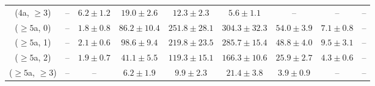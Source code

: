 \begin{table}[h!]
{\begin{tabular}{ccccccccc}
	(4a, $\ge3$) & -- & $6.2\pm 1.2$ & $19.0\pm 2.6$ & $12.3\pm 2.3$ & $5.6\pm 1.1$ & -- & -- & -- \\[0.5ex] 
	($\ge5$a, 0) & -- & $1.8\pm 0.8$ & $86.2\pm 10.4$ & $251.8\pm 28.1$ & $304.3\pm 32.3$ & $54.0\pm 3.9$ & $7.1\pm 0.8$ & -- \\[0.5ex] 
	($\ge5$a, 1) & -- & $2.1\pm 0.6$ & $98.6\pm 9.4$ & $219.8\pm 23.5$ & $285.7\pm 15.4$ & $48.8\pm 4.0$ & $9.5\pm 3.1$ & -- \\[0.5ex] 
	($\ge5$a, 2) & -- & $1.9\pm 0.7$ & $41.1\pm 5.5$ & $119.3\pm 15.1$ & $166.3\pm 10.6$ & $25.9\pm 2.7$ & $4.3\pm 0.6$ & -- \\[0.5ex] 
	($\ge5$a, $\ge3$) & -- & -- & $6.2\pm 1.9$ & $9.9\pm 2.3$ & $21.4\pm 3.8$ & $3.9\pm 0.9$ & -- & -- \\[0.5ex] 
	\hline
	\hline
\end{tabular}}
\end{table}
